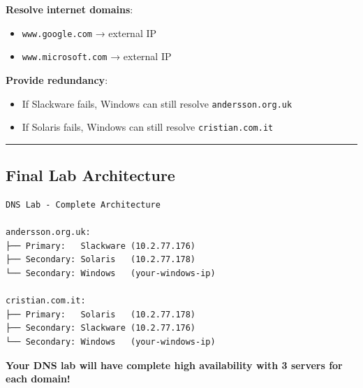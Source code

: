 \textbf{Resolve internet domains}:
\begin{itemize}
\tightlist
\item
  \texttt{www.google.com} → external IP
\item
  \texttt{www.microsoft.com} → external IP
\end{itemize}

\textbf{Provide redundancy}:
\begin{itemize}
\tightlist
\item
  If Slackware fails, Windows can still resolve \texttt{andersson.org.uk}
\item
  If Solaris fails, Windows can still resolve \texttt{cristian.com.it}
\end{itemize}

\begin{center}\rule{0.5\linewidth}{0.5pt}\end{center}

\subsection{Final Lab Architecture}\label{final-lab-architecture}

\begin{lstlisting}
DNS Lab - Complete Architecture

andersson.org.uk:
├── Primary:   Slackware (10.2.77.176)
├── Secondary: Solaris   (10.2.77.178)
└── Secondary: Windows   (your-windows-ip)

cristian.com.it:
├── Primary:   Solaris   (10.2.77.178)
├── Secondary: Slackware (10.2.77.176)
└── Secondary: Windows   (your-windows-ip)
\end{lstlisting}

\textbf{Your DNS lab will have complete high availability with 3 servers for each domain!}
